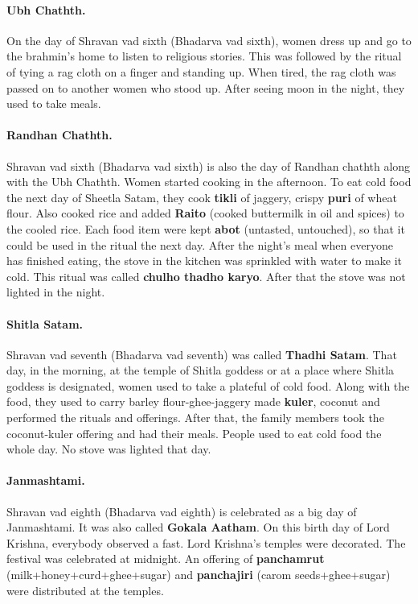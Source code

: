 \paragraph{Ubh Chathth.} On the day of Shravan vad sixth (Bhadarva vad sixth),
women dress up and go to the brahmin's home to listen to religious stories. This was
followed by the ritual of tying a rag cloth on a finger and standing up. When
tired, the rag cloth was passed on to another women who stood up. After seeing
moon in the night, they used to take meals.
\paragraph{Randhan Chathth.} Shravan vad sixth (Bhadarva vad sixth) is also the
day of Randhan chathth along with the Ubh Chathth. Women started cooking in the
afternoon. To eat cold food the next day of Sheetla Satam, they cook
\textbf{tikli} of jaggery, crispy \textbf{puri} of wheat flour. Also cooked rice
and added \textbf{Raito} (cooked buttermilk in oil and spices) to the cooled
rice. Each food item were kept \textbf{abot} (untasted, untouched), so that it
could be used in the ritual the next day. After the night's meal when everyone
has finished eating, the stove in the kitchen was sprinkled with water to make
it cold. This ritual was called \textbf{chulho thadho karyo}. After that the
stove was not lighted in the night.
\paragraph{Shitla Satam.} Shravan vad seventh (Bhadarva vad seventh) was called
\textbf{Thadhi Satam}. That day, in the morning, at the temple of Shitla goddess
or at a place where Shitla goddess is designated, women used to take a plateful
of cold food. Along with the food, they used to carry barley flour-ghee-jaggery
made \textbf{kuler}, coconut and performed the rituals and offerings. After
that, the family members took the coconut-kuler offering and had their meals.
People used to eat cold food the whole day. No stove was lighted that day.  
\paragraph{Janmashtami.} Shravan vad eighth (Bhadarva vad eighth) is celebrated
as a big day of Janmashtami. It was also called \textbf{Gokala Aatham}. On this
birth day of Lord Krishna, everybody observed a fast. Lord Krishna's temples were
decorated. The festival was celebrated at midnight. An offering of
\textbf{panchamrut} (milk+honey+curd+ghee+sugar) and \textbf{panchajiri} (carom
seeds+ghee+sugar) were distributed at the temples.
